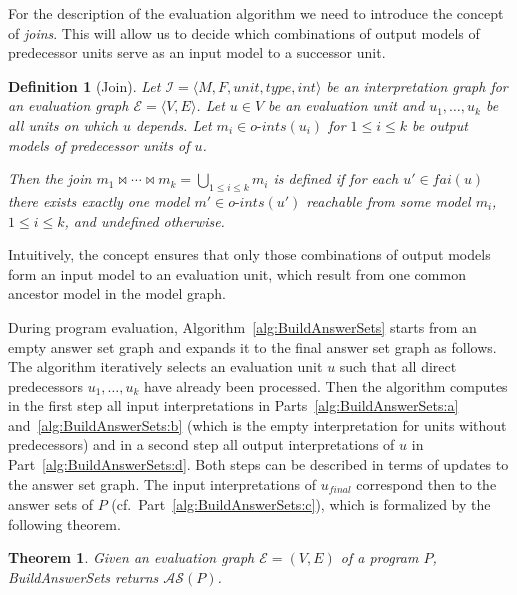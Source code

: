 \documentclass[11pt,fleqn,twoside]{article}
\newcommand{\Program}{\ensuremath{P}}
\newtheorem{theorem}{Theorem}
\newtheorem{definition}{Definition}
\begin{document}
{			For the description of the evaluation algorithm we need to introduce the concept of \emph{joins}.
			This will allow us to decide which combinations of output models of predecessor units serve
			as an input model to a successor unit.

			\begin{definition}[Join]
				\label{def:join}
				Let $\mathcal{I} = \langle M, F, \mathit{unit}, \mathit{type}, \mathit{int} \rangle$
				be an interpretation graph
				for an evaluation graph $\mathcal{E} = \langle V, E \rangle$.
				Let $u \in V$ be an evaluation unit and $u_1, \ldots, u_k$ be all units on which $u$
				depends.
				Let $m_i \in \mathit{o\mbox{-}ints}(u_i)$ for $1 \le i \le k$ be output models of predecessor
				units of $u$.
				
				Then the \emph{join} $m_1 \Join \cdots \Join m_k = \bigcup_{1 \le i \le k} m_i$
				is defined if for each $u' \in \mathit{fai}(u)$ there exists exactly
				one model $m' \in \mathit{o\mbox{-}ints}(u')$ reachable from some model $m_i$, $1 \le i \le k$,
				and undefined otherwise.
			\end{definition}

			Intuitively, the concept ensures that only those combinations of output models
			form an input model to an evaluation unit, which result from one common ancestor model
			in the model graph.

			During program evaluation,
			Algorithm~\ref{alg:BuildAnswerSets} starts from an empty answer set graph and expands it to the final answer set graph
			as follows.
			The algorithm iteratively selects an evaluation unit $u$ such that all direct predecessors $u_1, \ldots, u_k$
			have already been processed.
			Then the algorithm computes in the first step all input interpretations
			in Parts~\ref{alg:BuildAnswerSets:a} and~\ref{alg:BuildAnswerSets:b} (which is the empty interpretation for units without predecessors)
			and in a second step all
			output interpretations of $u$
			in Part~\ref{alg:BuildAnswerSets:d}. Both steps can be described in terms of updates to the answer set graph.
			The input interpretations of $u_{\mathit{final}}$ correspond then to the answer sets of $\Program$ (cf.~Part~\ref{alg:BuildAnswerSets:c}),
			which is formalized by the following theorem.
			
			\begin{theorem}
				\label{thm:BuildAnswerSets}
				Given an evaluation graph $\mathcal{E} = (V, E)$ of a program $\Program$,
				BuildAnswerSets returns $\mathcal{AS}(\Program)$.
			\end{theorem}
			
}
\end{document}
